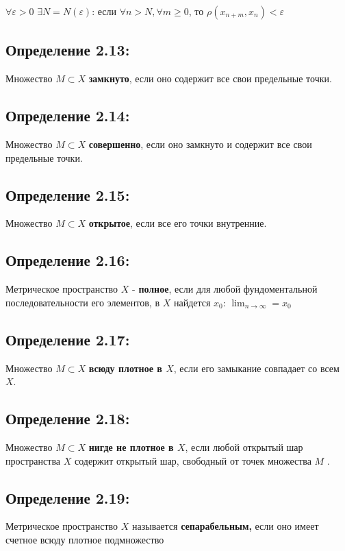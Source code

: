 \documentclass[12pt]{article}
\begin{document}
	 $\forall \varepsilon > 0$ $ \exists N = N(\varepsilon)$: 
	 если $\forall n > N, \forall m \ge 0$, то 
	 $\rho(x_{n+m}, x_n) < \varepsilon$
	 
\subsection*{Определение 2.13:} \label{eq101}
	 Множество $M \subset X$ \textbf{замкнуто}, если оно содержит все свои предельные точки.

\subsection*{Определение 2.14:}
	 Множество $M \subset X$\textbf{ совершенно}, если оно замкнуто и содержит все свои предельные точки.
	 
\subsection*{Определение 2.15:}
	 Множество $M \subset X$ \textbf{открытое}, если все его точки внутренние.
	 
\subsection*{Определение 2.16:}
	 Метрическое пространство $X$ - \textbf{полное}, если для любой фундоментальной последовательности его элементов, 
	 в $X$ найдется $x_0$: $\lim_{n \to \infty} = x_0$

\subsection*{Определение 2.17:}
 Множество $M \subset X$ \textbf{всюду плотное в $X$}, если его замыкание совпадает со всем $X$.
 
\subsection*{Определение 2.18:}
 Множество $M \subset X$ \textbf{нигде не  плотное в $X$}, если любой открытый шар пространства $X$
содержит открытый шар, свободный от точек множества $M$ .
	 	
\subsection*{Определение 2.19:}	 	
	 Метрическое пространство $X$ называется \textbf{сепарабельным,}
		если оно имеет счетное всюду плотное подмножество
\end{document}
